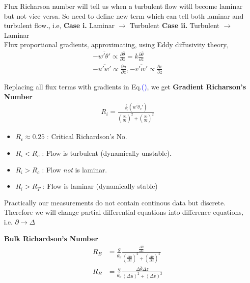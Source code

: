 \documentclass[fleqn,10pt]{SelfArx} %
\newcommand{\myeqref}[1]{Eq.\textcolor{blue}{\textup{(\getrefnumber{#1})}}}
\begin{document}
Flux Richarson number will tell us when a turbulent flow witll become laminar but not vice versa. So need to define new term which can tell both laminar and turbulent flow., i.e,\newline
\textbf{Case i.} Laminar \(\rightarrow\) Turbulent \newline
\textbf{Case ii.} Turbulent \(\rightarrow\) Laminar  \\

Flux proportional gradients, approximating, using Eddy diffusivity theory,
\begin{align*}
	-\overline{w'\theta'} \propto \frac{\partial \overline{\theta}}{\partial z} = k\frac{\partial \overline{\theta}}{\partial z} \\
	-\overline{u'w'} \propto \frac{\partial \overline{u}}{\partial z}, -\overline{v'w'} \propto \frac{\partial \overline{v}}{\partial z}
\end{align*}

Replacing all flux terms with gradients in \myeqref{eq:15.2}, we get \textbf{Gradient Richarson's Number}
\begin{align*}
	R_i = \frac{\frac{g}{\theta_v}\left(\overline{w'\theta_v'}\right)}{\left(\frac{\partial \overline{u}}{\partial z}\right)^2 + \left(\frac{\partial \overline{v}}{\partial z}\right)^2} \tag{15.3} \label{eq:15.3}
\end{align*}

\begin{itemize}[noitemsep]
	\item \(R_c \approx 0.25 \) : Critical Richardson's No.
	\item \(R_i < R_c\) : Flow is turbulent (dynamically unstable).
	\item \( R_i > R_c \) : Flow \textit{not} is laminar.
	\item \( R_i > R_T \) : Flow is laminar (dynamically stable)
\end{itemize}

Practically our measurements do not contain continous data but discrete. Therefore we will change partial differential equations into difference equations, i.e. \(\partial \rightarrow \Delta\)

\textbf{Bulk Richardson's Number}
\begin{align*}
	R_B &= \frac{g}{\overline{\theta_v}}\frac{\frac{\Delta \overline{\theta}}{\Delta z}}{\left(\frac{\Delta \overline{u}}{\Delta z}\right)^2 + \left(\frac{\Delta \overline{v}}{\Delta z}\right)^2} \\
	R_B &= \frac{g}{\overline{\theta_v}}\frac{\Delta \overline{\theta}\Delta z}{\left(\Delta \overline{u}\right)^2 + \left(\Delta \overline{v}\right)^2} \tag{15.4} \label{eq:15.4}
\end{align*}

\clearpage


\end{document}
